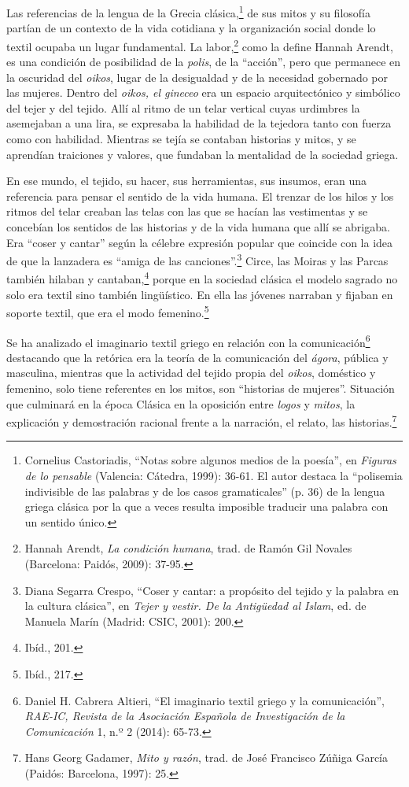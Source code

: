 \documentclass{tufte-handout}
\begin{document}
Las referencias de la lengua de la Grecia clásica,\footnote{Cornelius
  Castoriadis, ``Notas sobre algunos medios de la poesía'', en
  \emph{Figuras de lo pensable} (Valencia: Cátedra, 1999): 36-61. El
  autor destaca la ``polisemia indivisible de las palabras y de los
  casos gramaticales'' (p. 36) de la lengua griega clásica por la que a
  veces resulta imposible traducir una palabra con un sentido único.} de
sus mitos y su filosofía partían de un contexto de la vida cotidiana y
la organización social donde lo textil ocupaba un lugar fundamental. La
labor,\footnote{Hannah Arendt, \emph{La condición humana}, trad. de
  Ramón Gil Novales (Barcelona: Paidós, 2009): 37-95.} como la define
Hannah Arendt, es una condición de posibilidad de la \emph{polis}, de la
``acción'', pero que permanece en la oscuridad del \emph{oikos}, lugar
de la desigualdad y de la necesidad gobernado por las mujeres. Dentro
del \emph{oikos, el gineceo} era un espacio arquitectónico y simbólico
del tejer y del tejido. Allí al ritmo de un telar vertical cuyas
urdimbres la asemejaban a una lira, se expresaba la habilidad
de la tejedora tanto con fuerza como con habilidad. Mientras se tejía se
contaban historias y mitos, y se aprendían traiciones y valores, que
fundaban la mentalidad de la sociedad griega.

En ese mundo, el tejido, su hacer, sus herramientas, sus insumos, eran
una referencia para pensar el sentido de la vida humana. El trenzar de
los hilos y los ritmos del telar creaban las telas con las que se hacían
las vestimentas y se concebían los sentidos de las historias y de la
vida humana que allí se abrigaba. Era ``coser y cantar'' según la
célebre expresión popular que coincide con la idea de que la lanzadera
es ``amiga de las canciones''.\footnote{Diana Segarra Crespo, ``Coser y
  cantar: a propósito del tejido y la palabra en la cultura clásica'',
  en \emph{Tejer y vestir. De la Antigüedad al Islam}, ed. de Manuela
  Marín (Madrid: CSIC, 2001): 200.} Circe, las Moiras y las Parcas
también hilaban y cantaban,\footnote{Ibíd., 201.} porque en la sociedad
clásica el modelo sagrado no solo era textil sino también lingüístico.
En ella las jóvenes narraban y fijaban en soporte textil, que era el
modo femenino.\footnote{Ibíd., 217.}

Se ha analizado el imaginario textil griego en relación con la
comunicación\footnote{Daniel H. Cabrera Altieri, ``El imaginario textil
  griego y la comunicación'', \emph{RAE-IC, Revista de la Asociación
  Española de Investigación de la Comunicación} 1, n.º 2 (2014): 65-73.}
destacando que la retórica era la teoría de la comunicación del
\emph{ágora}, pública y masculina, mientras que la actividad del tejido
propia del \emph{oikos}, doméstico y femenino, solo tiene referentes en
los mitos, son ``historias de mujeres''. Situación que culminará en la
época Clásica en la oposición entre \emph{logos} y \emph{mitos}, la
explicación y demostración racional frente a la narración, el relato,
las historias.\footnote{Hans Georg Gadamer, \emph{Mito y razón}, trad.
  de José Francisco Zúñiga García (Paidós: Barcelona, 1997): 25.}
\end{document}
